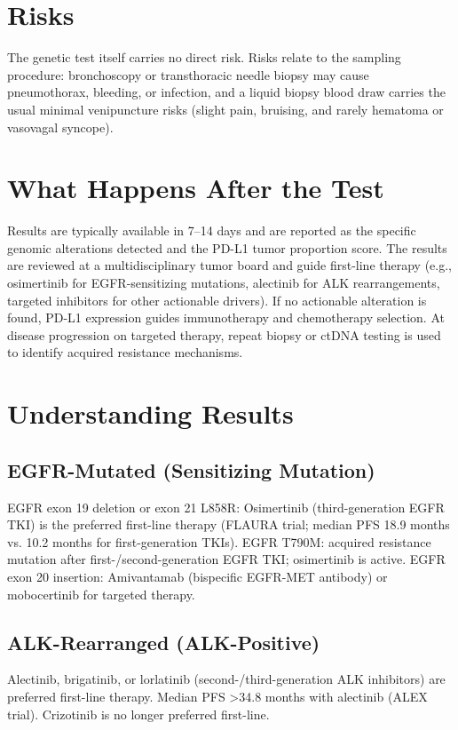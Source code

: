 \section*{Risks}
The genetic test itself carries no direct risk. Risks relate to the sampling procedure: bronchoscopy or transthoracic needle biopsy may cause pneumothorax, bleeding, or infection, and a liquid biopsy blood draw carries the usual minimal venipuncture risks (slight pain, bruising, and rarely hematoma or vasovagal syncope).

\section*{What Happens After the Test}
Results are typically available in 7--14 days and are reported as the specific genomic alterations detected and the PD-L1 tumor proportion score. The results are reviewed at a multidisciplinary tumor board and guide first-line therapy (e.g., osimertinib for EGFR-sensitizing mutations, alectinib for ALK rearrangements, targeted inhibitors for other actionable drivers). If no actionable alteration is found, PD-L1 expression guides immunotherapy and chemotherapy selection. At disease progression on targeted therapy, repeat biopsy or ctDNA testing is used to identify acquired resistance mechanisms.

\section*{Understanding Results}

\subsection*{EGFR-Mutated (Sensitizing Mutation)}
EGFR exon 19 deletion or exon 21 L858R: Osimertinib (third-generation EGFR TKI) is the preferred first-line therapy (FLAURA trial; median PFS 18.9 months vs. 10.2 months for first-generation TKIs). EGFR T790M: acquired resistance mutation after first-/second-generation EGFR TKI; osimertinib is active. EGFR exon 20 insertion: Amivantamab (bispecific EGFR-MET antibody) or mobocertinib for targeted therapy.

\subsection*{ALK-Rearranged (ALK-Positive)}
Alectinib, brigatinib, or lorlatinib (second-/third-generation ALK inhibitors) are preferred first-line therapy. Median PFS >34.8 months with alectinib (ALEX trial). Crizotinib is no longer preferred first-line.

